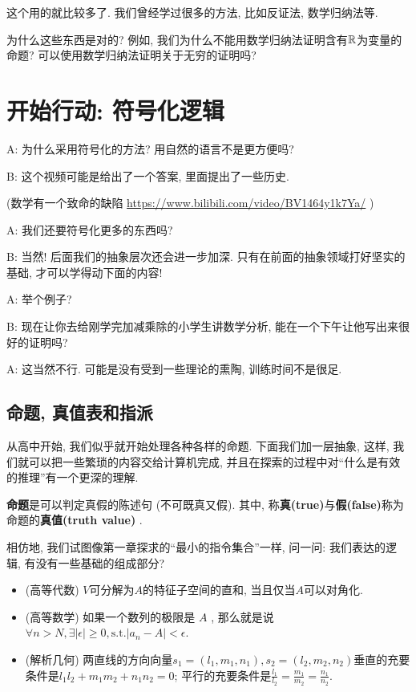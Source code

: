  这个用的就比较多了. 我们曾经学过很多的方法, 比如反证法, 数学归纳法等. 

\begin{bonus}
	为什么这些东西是对的? 例如, 我们为什么不能用数学归纳法证明含有$\mathbb{R}$为变量的命题? 可以使用数学归纳法证明关于无穷的证明吗? 
\end{bonus}

\section{开始行动: 符号化逻辑}

\begin{dialogue}
	A: 为什么采用符号化的方法? 用自然的语言不是更方便吗? 
	
	B: 这个视频可能是给出了一个答案, 里面提出了一些历史.
	
	(数学有一个致命的缺陷 \url{https://www.bilibili.com/video/BV1464y1k7Ya/} )
	
	A: 我们还要符号化更多的东西吗? 
	
	B: 当然! 后面我们的抽象层次还会进一步加深. 只有在前面的抽象领域打好坚实的基础, 才可以学得动下面的内容!
	
	A: 举个例子?
	
	B: 现在让你去给刚学完加减乘除的小学生讲数学分析, 能在一个下午让他写出来很好的证明吗? 
	
	A: 这当然不行. 可能是没有受到一些理论的熏陶, 训练时间不是很足. 
\end{dialogue}

\subsection{命题, 真值表和指派}

从高中开始, 我们似乎就开始处理各种各样的命题. 下面我们加一层抽象, 这样, 我们就可以把一些繁琐的内容交给计算机完成, 并且在探索的过程中对``什么是有效的推理''有一个更深的理解. 


\begin{definition}[命题(proposition)]
	{\bf 命题}是可以判定真假的陈述句 (不可既真又假). 其中, 称{\bf 真(true)}与{\bf 假(false)}称为命题的{\bf 真值(truth value) }. 
\end{definition}

相仿地, 我们试图像第一章探求的``最小的指令集合''一样, 问一问: 我们表达的逻辑, 有没有一些基础的组成部分? 

\begin{example}
	\begin{itemize}
		\item (高等代数) $V$可分解为$A$的特征子空间的直和, 当且仅当$A$可以对角化. 
		\item (高等数学) 如果一个数列的极限是 $A$ , 那么就是说$\forall n>N, \exists |\epsilon|\geq 0, \text{s.t.} |a_n-A|<\epsilon$.
		\item (解析几何) 两直线的方向向量$s_{1}=(l_{1},m_{1},n_{1}),s_{2}=(l_{2},m_{2},n_{2})$垂直的充要条件是$l_{1}l_{2}+m_{1}m_{2}+n_{1}n_{2}=0$;
平行的充要条件是$\frac{l_{1}}{l_{2}}=\frac{m_{1}}{m_{2}}=\frac{n_{1}}{n_{2}}.$
	\end{itemize}
\end{example}



